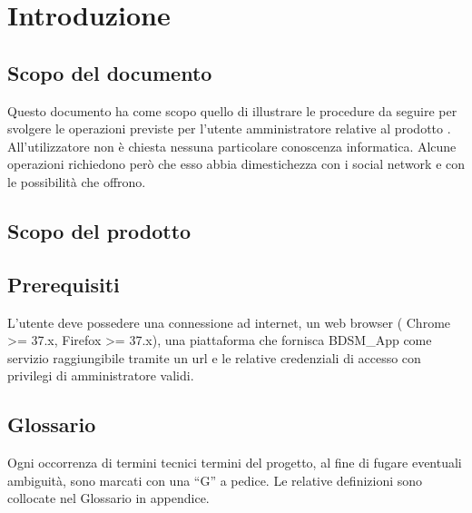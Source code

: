 %


\section{Introduzione} %
\label{sec:introduzione}
	\subsection{Scopo del documento} %
	\label{sub:scopo_del_documento}
	Questo documento ha come scopo quello di illustrare le procedure da seguire per svolgere le operazioni previste per l'utente amministratore relative al prodotto \projectName. All'utilizzatore non è chiesta nessuna particolare conoscenza informatica. Alcune operazioni richiedono però che esso abbia dimestichezza con i social network e con le possibilità che offrono.

	\subsection{Scopo del prodotto} %
	\label{sub:scopo_del_prodotto}
	\productScope

	\subsection{Prerequisiti} %
	\label{sub:prerequisiti}
	L’utente deve possedere una connessione ad internet, un web browser ( Chrome >= 37.x, Firefox >= 37.x), una piattaforma che fornisca BDSM\_App come servizio raggiungibile tramite un url e le relative credenziali di accesso con privilegi di amministratore validi.

	\subsection{Glossario} %
	\label{sub:glossario}
	Ogni occorrenza di termini tecnici termini del progetto, al fine di fugare eventuali ambiguità, sono marcati con una “G” a pedice. Le relative definizioni sono collocate nel Glossario in appendice.

